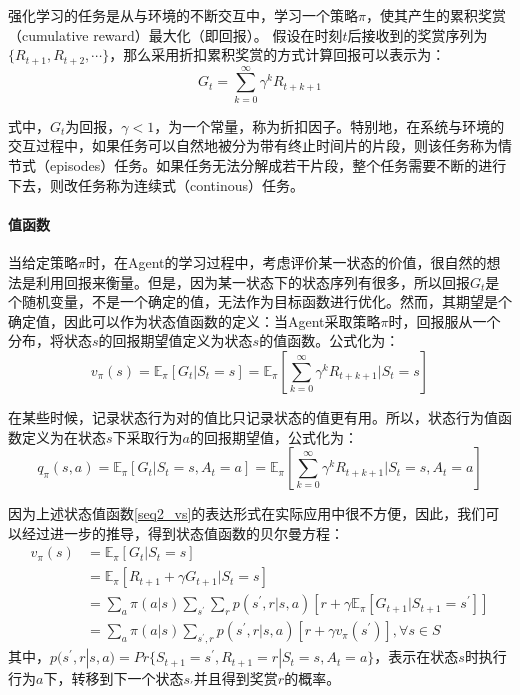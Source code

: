 强化学习的任务是从与环境的不断交互中，学习一个策略$\pi$，使其产生的累积奖赏（cumulative reward）最大化（即回报）。
假设在时刻$t$后接收到的奖赏序列为$\{R_{t+1}, R_{t+2},\cdots\}$，那么采用折扣累积奖赏的方式计算回报可以表示为：
\begin{equation}
G_{t}=\sum_{k=0}^{\infty}\gamma^{k}R_{t+k+1}
\end{equation}

式中，$G_{t}$为回报，$\gamma<1$，为一个常量，称为折扣因子。特别地，在系统与环境的交互过程中，如果任务可以自然地被分为带有终止时间片的片段，则该任务称为情节式（episodes）任务。如果任务无法分解成若干片段，整个任务需要不断的进行下去，则改任务称为连续式（continous）任务。

\paragraph{值函数}
当给定策略$\pi$时，在Agent的学习过程中，考虑评价某一状态的价值，很自然的想法是利用回报来衡量。但是，因为某一状态下的状态序列有很多，所以回报$G_{t}$是个随机变量，不是一个确定的值，无法作为目标函数进行优化。然而，其期望是个确定值，因此可以作为状态值函数的定义：当Agent采取策略$\pi$时，回报服从一个分布，将状态$s$的回报期望值定义为状态$s$的值函数。公式化为：
\begin{equation}
\label{seq2_vs}
v_{\pi}(s)=\mathbb{E}_{\pi}[G_{t}|S_t=s]=\mathbb{E}_{\pi}[\sum_{k=0}^{\infty}\gamma^{k}R_{t+k+1}|S_t=s]
\end{equation}


在某些时候，记录状态行为对的值比只记录状态的值更有用。所以，状态行为值函数定义为在状态$s$下采取行为$a$的回报期望值，公式化为：
\begin{equation}
\label{seq2_qsa}
q_{\pi}(s,a)=\mathbb{E}_{\pi}[G_{t}|S_t=s,A_t=a]
=\mathbb{E}_{\pi}[\sum_{k=0}^{\infty}\gamma^{k}R_{t+k+1}|S_t=s,A_t=a]
\end{equation}

因为上述状态值函数\eqref{seq2_vs}的表达形式在实际应用中很不方便，因此，我们可以经过进一步的推导，得到状态值函数的贝尔曼方程：
\begin{equation}
\label{seq1}
\begin{aligned}
v_{\pi}(s)&=\mathbb{E}_{\pi}[G_{t}|S_t=s]\\
&=\mathbb{E}_{\pi}[R_{t+1}+\gamma G_{t+1}|S_t=s]\\
&=\sum_{a}\pi(a|s)\sum_{s^{'}}\sum_{r}p(s^{'},r|s,a)[r + \gamma\mathbb{E}_{\pi}[G_{t+1}|S_{t+1}=s^{'}]]\\
&=\sum_{a}\pi(a|s)\sum_{s^{'},r}p(s^{'},r|s,a)[r+\gamma v_{\pi}(s^{'})], \forall s \in S
\end{aligned}
\end{equation}
其中，$p(s^{'},r|s,a) = Pr\{S_{t+1}=s^{'}, R_{t+1}=r|S_{t}=s, A_{t}=a\}$，表示在状态$s$时执行行为$a$下，转移到下一个状态$s_{'}$并且得到奖赏$r$的概率。

